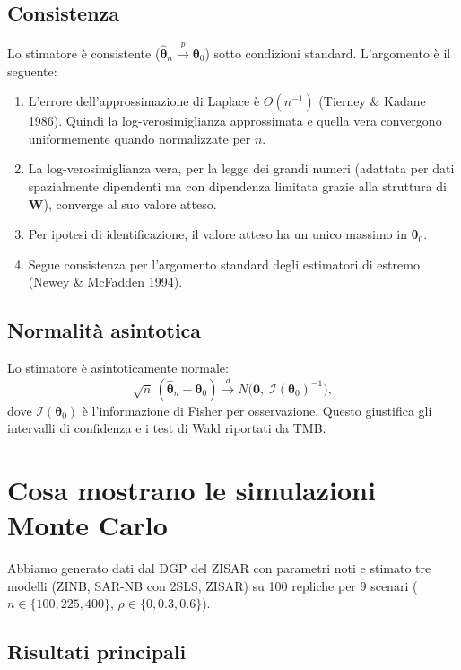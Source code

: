 \documentclass[12pt,a4paper]{article}
\newcommand{\bW}{\mathbf{W}}
\begin{document}
\subsection{Consistenza}

Lo stimatore \`e consistente ($\hat{\boldsymbol{\theta}}_n \overset{p}{\to} \boldsymbol{\theta}_0$) sotto condizioni standard. L'argomento \`e il seguente:
\begin{enumerate}
  \item L'errore dell'approssimazione di Laplace \`e $O(n^{-1})$ (Tierney \& Kadane 1986). Quindi la log-verosimiglianza approssimata e quella vera convergono uniformemente quando normalizzate per $n$.
  \item La log-verosimiglianza vera, per la legge dei grandi numeri (adattata per dati spazialmente dipendenti ma con dipendenza limitata grazie alla struttura di $\bW$), converge al suo valore atteso.
  \item Per ipotesi di identificazione, il valore atteso ha un unico massimo in $\boldsymbol{\theta}_0$.
  \item Segue consistenza per l'argomento standard degli estimatori di estremo (Newey \& McFadden 1994).
\end{enumerate}

\subsection{Normalit\`a asintotica}

Lo stimatore \`e asintoticamente normale:
\[
  \sqrt{n}\,(\hat{\boldsymbol{\theta}}_n - \boldsymbol{\theta}_0) \overset{d}{\to} N\bigl(\mathbf{0},\;\mathcal{I}(\boldsymbol{\theta}_0)^{-1}\bigr),
\]
dove $\mathcal{I}(\boldsymbol{\theta}_0)$ \`e l'informazione di Fisher per osservazione. Questo giustifica gli intervalli di confidenza e i test di Wald riportati da TMB.

\section{Cosa mostrano le simulazioni Monte Carlo}

Abbiamo generato dati dal DGP del ZISAR con parametri noti e stimato tre modelli (ZINB, SAR-NB con 2SLS, ZISAR) su 100 repliche per 9 scenari ($n \in \{100, 225, 400\}$, $\rho \in \{0, 0.3, 0.6\}$).

\subsection{Risultati principali}
\end{document}

